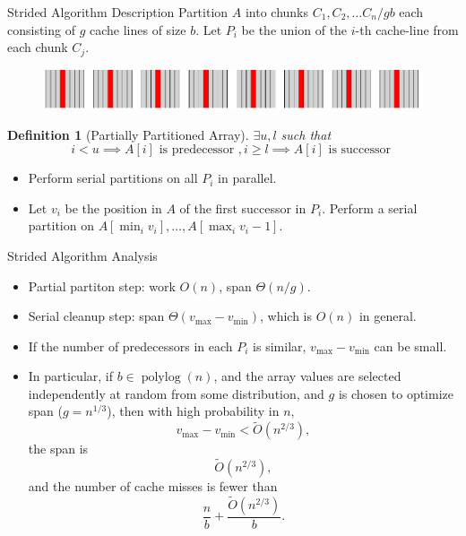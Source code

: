 \documentclass[x11names, svgnames, rgb]{beamer}
\newcommand{\polylog}{\operatorname{polylog}}
\newtheorem{defin}{Definition}
\begin{document}
\begin{frame}[t]{Strided Algorithm \cite{FrancisPa92, Frias08} Description}
	Partition $A$ into chunks $C_1,C_2,\ldots C_n/gb$ each consisting of $g$ cache lines of size $b$. Let $P_i$ be the union of the $i$-th cache-line from each chunk $C_j$.
	\begin{figure}
		\includegraphics[width=\linewidth]{imgs/stridedAlgHighlighted.png}
	\end{figure}
	\begin{defin}[Partially Partitioned Array]
		$\exists u, l $ such that $$i < u \implies A[i] \text{ is predecessor }, i \ge l \implies A[i] \text{ is successor }$$
	\end{defin}
	\begin{itemize}
		\item Perform serial partitions on all $P_i$ in parallel.
		\item Let $v_i$ be the position in $A$ of the first successor in $P_i$. Perform a serial partition on $A[\min_i v_i], \ldots, A[\max_i v_i -1]$.
	\end{itemize}
\end{frame}

\begin{frame}[t]{Strided Algorithm Analysis}
	\begin{itemize}
		\item Partial partiton step: work $O(n)$, span $\Theta(n/g)$.
		\item Serial cleanup step: span $\Theta(v_\text{max}-v_\text{min})$, which is $O(n)$ in general.
		\item If the number of predecessors in each $P_i$ is similar, $v_\text{max}-v_\text{min}$ can be small.
		\item In particular, if $b\in \polylog(n)$, and the array values are selected independently at random from some distribution, and $g$ is chosen to optimize span ($g=n^{1/3}$), then with high probability in $n$, $$v_\text{max}-v_\text{min} < \tilde{O}(n^{2/3}),$$ the span is $$\tilde{O}(n^{2/3}),$$ and the number of cache misses is fewer than $$\frac{n}{b}+\frac{\tilde{O}(n^{2/3})}{b}.$$
	\end{itemize}
\end{frame}
\end{document}
